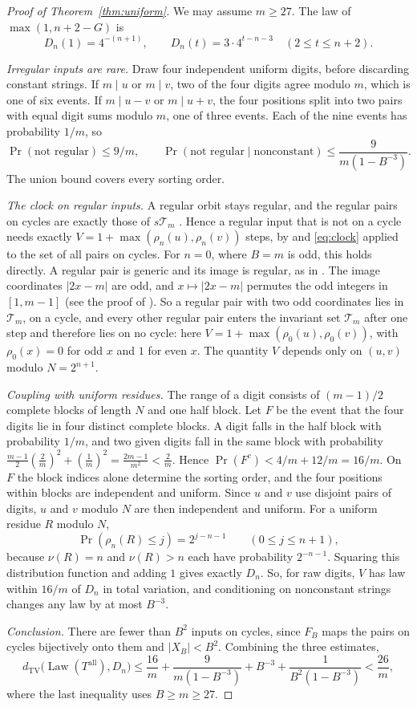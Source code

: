 \documentclass[11pt]{amsart}
\theoremstyle{remark}
\newcommand{\T}{\mathcal{T}}
\newcommand{\vt}{\nu}
\newcommand{\dtv}{d_{\mathrm{TV}}}
\begin{document}
\begin{proof}[Proof of Theorem~\ref{thm:uniform}]
We may assume $m\ge27$. The law of $\max(1,n+2-G)$ is
\[
D_n(1)=4^{-(n+1)},\qquad D_n(t)=3\cdot4^{t-n-3}\quad(2\le t\le n+2).
\]

\emph{Irregular inputs are rare.} Draw four independent uniform digits, before discarding constant strings. If $m\mid u$ or $m\mid v$, two of the four digits agree modulo $m$, which is one of six events. If $m\mid u-v$ or $m\mid u+v$, the four positions split into two pairs with equal digit sums modulo $m$, one of three events. Each of the nine events has probability $1/m$, so
\[
\Pr(\text{not regular})\le9/m,\qquad\Pr(\text{not regular}\mid\text{nonconstant})\le\frac9{m(1-B^{-3})}.
\]
The union bound covers every sorting order.

\emph{The clock on regular inputs.} A regular orbit stays regular, and the regular pairs on cycles are exactly those of $s\T_m$ \cite[Lemma~6]{G1}. Hence a regular input that is not on a cycle needs exactly $V=1+\max(\rho_n(u),\rho_n(v))$ steps, by \cite[Lemma~6(b)]{G1} and \eqref{eq:clock} applied to the set of all pairs on cycles. For $n=0$, where $B=m$ is odd, this holds directly. A regular pair is generic and its image is regular, as in \cite[Lemma~6(a)]{G1}. The image coordinates $|2x-m|$ are odd, and $x\mapsto|2x-m|$ permutes the odd integers in $[1,m-1]$ (see the proof of \cite[Lemma~3]{G1}). So a regular pair with two odd coordinates lies in $\T_m$, on a cycle, and every other regular pair enters the invariant set $\T_m$ after one step and therefore lies on no cycle: here $V=1+\max(\rho_0(u),\rho_0(v))$, with $\rho_0(x)=0$ for odd $x$ and $1$ for even $x$. The quantity $V$ depends only on $(u,v)$ modulo $N=2^{n+1}$.

\emph{Coupling with uniform residues.} The range of a digit consists of $(m-1)/2$ complete blocks of length $N$ and one half block. Let $F$ be the event that the four digits lie in four distinct complete blocks. A digit falls in the half block with probability $1/m$, and two given digits fall in the same block with probability $\frac{m-1}2(\frac2m)^2+(\frac1m)^2=\frac{2m-1}{m^2}<\frac2m$. Hence $\Pr(F^c)<4/m+12/m=16/m$. On $F$ the block indices alone determine the sorting order, and the four positions within blocks are independent and uniform. Since $u$ and $v$ use disjoint pairs of digits, $u$ and $v$ modulo $N$ are then independent and uniform. For a uniform residue $R$ modulo $N$,
\[
\Pr(\rho_n(R)\le j)=2^{j-n-1}\qquad(0\le j\le n+1),
\]
because $\vt(R)=n$ and $\vt(R)>n$ each have probability $2^{-n-1}$. Squaring this distribution function and adding $1$ gives exactly $D_n$. So, for raw digits, $V$ has law within $16/m$ of $D_n$ in total variation, and conditioning on nonconstant strings changes any law by at most $B^{-3}$.

\emph{Conclusion.} There are fewer than $B^2$ inputs on cycles, since $F_B$ maps the pairs on cycles bijectively onto them and $|X_B|<B^2$. Combining the three estimates,
\[
\dtv\bigl(\operatorname{Law}(T^{\mathrm{all}}),D_n\bigr)\le\frac{16}m+\frac9{m(1-B^{-3})}+B^{-3}+\frac1{B^2(1-B^{-3})}<\frac{26}m,
\]
where the last inequality uses $B\ge m\ge27$.
\end{proof}
\end{document}
